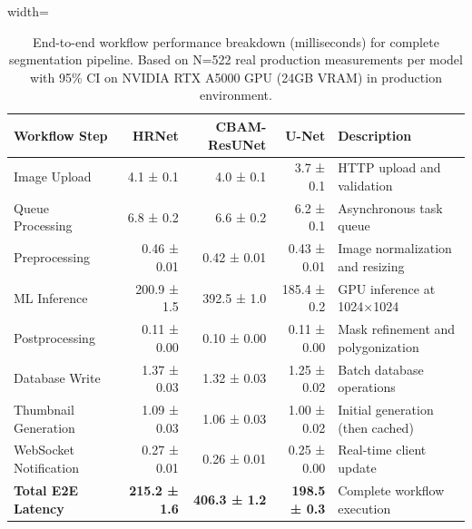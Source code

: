 \documentclass[preprint,12pt]{elsarticle}
\begin{document}
\begin{table}[!h]
\centering
\caption{End-to-end workflow performance breakdown (milliseconds) for complete segmentation pipeline. Based on N=522 real production measurements per model with 95\% CI on NVIDIA RTX A5000 GPU (24GB VRAM) in production environment.}
\label{tab:e2e-workflow}
\begin{adjustbox}{width=\textwidth}
\begin{tabular}{@{}lrrrp{6.5cm}@{}}
\toprule
\textbf{Workflow Step} & \textbf{HRNet} & \textbf{CBAM-ResUNet} & \textbf{U-Net} & \textbf{Description} \\
\midrule
Image Upload & 4.1 ± 0.1 & 4.0 ± 0.1 & 3.7 ± 0.1 & HTTP upload and validation \\
Queue Processing & 6.8 ± 0.2 & 6.6 ± 0.2 & 6.2 ± 0.1 & Asynchronous task queue \\
Preprocessing & 0.46 ± 0.01 & 0.42 ± 0.01 & 0.43 ± 0.01 & Image normalization and resizing \\
ML Inference & 200.9 ± 1.5 & 392.5 ± 1.0 & 185.4 ± 0.2 & GPU inference at 1024×1024 \\
Postprocessing & 0.11 ± 0.00 & 0.10 ± 0.00 & 0.11 ± 0.00 & Mask refinement and polygonization \\
Database Write & 1.37 ± 0.03 & 1.32 ± 0.03 & 1.25 ± 0.02 & Batch database operations \\
Thumbnail Generation & 1.09 ± 0.03 & 1.06 ± 0.03 & 1.00 ± 0.02 & Initial generation (then cached) \\
WebSocket Notification & 0.27 ± 0.01 & 0.26 ± 0.01 & 0.25 ± 0.00 & Real-time client update \\
\midrule
\textbf{Total E2E Latency} & \textbf{215.2 ± 1.6} & \textbf{406.3 ± 1.2} & \textbf{198.5 ± 0.3} & Complete workflow execution \\
\bottomrule
\end{tabular}
\end{adjustbox}
\end{table}
\end{document}
